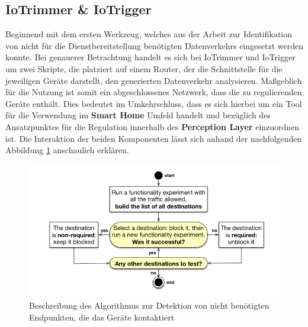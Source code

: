 \subsection{IoTrimmer \& IoTrigger}
\label{sec:Regulationsmöglichkeiten:ssec:IoTrimmer und IoTrigger}

Beginnend mit dem ersten Werkzeug, welches aus der Arbeit \cite{Mandalari2021} zur Identifikation von nicht für die Dienstbereitstellung benötigten Datenverkehrs eingesetzt werden konnte. Bei genauerer Betrachtung handelt es sich bei IoTrimmer und IoTrigger \cite{IoTrim2021} um zwei Skripte, die platziert auf einem Router, der die Schnittstelle für die jeweiligen Geräte darstellt, den generierten Datenverkehr analysieren. 
Maßgeblich für die Nutzung ist somit ein abgeschlossenes Netzwerk, dass die zu regulierenden Geräte enthält. Dies bedeutet im Umkehrschluss, dass es sich hierbei um ein Tool für die Verwendung im \textbf{Smart Home} Umfeld handelt und bezüglich des Ansatzpunktes für die Regulation innerhalb des \textbf{Perception Layer} einzuordnen ist.
Die Interaktion der beiden Komponenten lässt sich anhand der nachfolgenden Abbildung \ref{fig:iotrigger-iotrimmer} anschaulich erklären.

\begin{figure}
    \centering
    \includegraphics[width=\textwidth]{main/countermeasures/pictures/Identification_Non_Essential_Traffic}
    \caption{Beschreibung des Algorithmus zur Detektion von nicht benötigten Endpunkten, die das Geräte kontaktiert \cite{Mandalari2021}}
    \label{fig:iotrigger-iotrimmer}
\end{figure}

